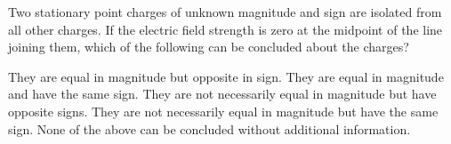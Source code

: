 \begin{questions}\setcounter{question}{23}\question
Two stationary point charges of unknown magnitude and sign are isolated from all other charges. If the electric field strength is zero at the midpoint of the line joining them, which of the following can be concluded about the charges?

\begin{choices}
    \choice  They are equal in magnitude but opposite in sign.
    \choice  They are equal in magnitude and have the same sign.
    \choice  They are not necessarily equal in magnitude but have opposite signs.
    \choice  They are not necessarily equal in magnitude but have the same sign.
    \choice  None of the above can be concluded without additional information.
\end{choices}
\end{questions}
